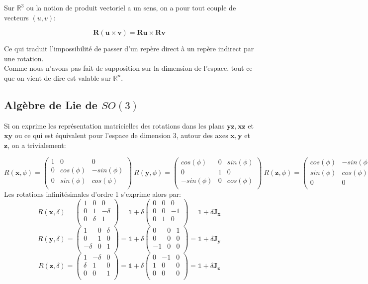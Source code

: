 \documentclass[12pt,a4paper]{article}
\newcommand{\unit}
{
\bm{\mathds{1}}
}
\newcommand{\Jx}
{
\begin{pmatrix}
	0&0&0\\
	0&0&-1\\
	0&1&0\\
\end{pmatrix}
}
\newcommand{\Jy}
{
	\begin{pmatrix}
		0&0&1\\
		0&0&0\\
		-1&0&0\\
	\end{pmatrix}
}
\newcommand{\Jz}
{
	\begin{pmatrix}
		0&-1&0\\
		1&0&0\\
		0&0&0\\
	\end{pmatrix}
}
\begin{document}
	
	Sur $\mathbb{R}^3$ ou la notion de produit vectoriel a un sens, on a pour tout couple de vecteurs $(u,v)$:
	
	\[
		\boxed{\bm{R}(\bm{u} \times \bm{v})=\bm{R}\bm{u} \times \bm{R}\bm{v}}
	\]
	
	Ce qui traduit l'impossibilité de passer d'un repère direct à un repère indirect par une rotation.\\
	
	Comme nous n'avons pas fait de supposition sur la dimension de l'espace, tout ce que on vient de dire est valable sur $\mathbb{R}^n$.
	
	\newpage
	\subsection{Algèbre de Lie de $SO(3)$}
	
	Si on exprime les représentation matricielles des rotations dans les plans $\bm{yz},\bm{xz}$ et $\bm{xy}$ ou ce qui est équivalent pour l'espace de dimension 3, autour des axes $\bm{x},\bm{y}$ et $\bm{z}$, on a trivialement:
	
	\[	
	R(\bm{x},\phi)=
	\begin{pmatrix}
	1&0&0\\
	0&cos(\phi)&-sin(\phi)\\
	0&sin(\phi)&cos(\phi)\\	
	\end{pmatrix}\ 
	R(\bm{y},\phi)=
	\begin{pmatrix}
	cos(\phi)&0&sin(\phi)\\
	0&1&0\\
	-sin(\phi)&0&cos(\phi)\\
	\end{pmatrix}
	\  
	R(\bm{z},\phi)=
	\begin{pmatrix}
	cos(\phi)&-sin(\phi)&0\\
	sin(\phi)&cos(\phi)&0\\
	0&0&1\\
	\end{pmatrix}
	\]
	Les rotations infinitésimales d'ordre 1 s'exprime alors par:
	\[	
	R(\bm{x},\delta)=
	\begin{pmatrix}
	1&0&0\\
	0&1&-\delta\\
	0&\delta&1\\	
	\end{pmatrix}= \unit + \delta \Jx= \unit + \delta \bm{J_x}
	\]
	\[	
	R(\bm{y},\delta)=
	\begin{pmatrix}
	1&0&\delta\\
	0&1&0\\
	-\delta&0&1\\
	\end{pmatrix}= \unit + \delta \Jy= \unit + \delta \bm{J_y}
	\]
	\[	
	R(\bm{z},\delta)=
	\begin{pmatrix}
	1&-\delta&0\\
	\delta&1&0\\
	0&0&1\\
	\end{pmatrix}= \unit + \delta \Jz= \unit + \delta \bm{J_z}
	\]
	
\end{document}
